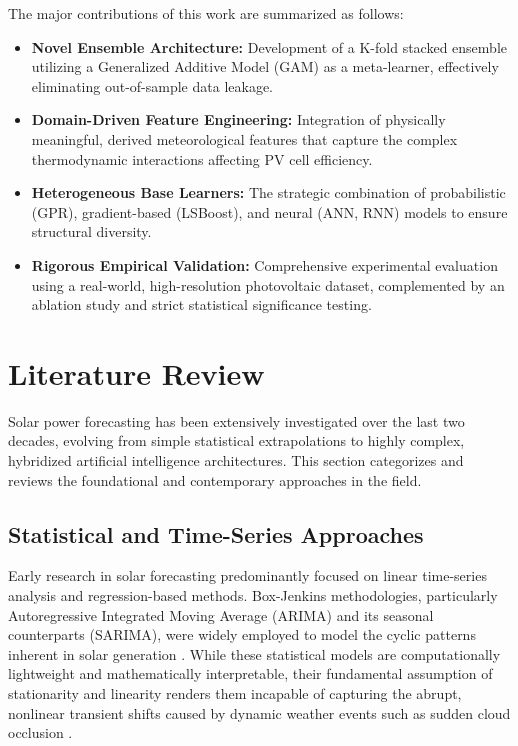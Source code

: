 \documentclass[conference]{IEEEtran}
\begin{document}
The major contributions of this work are summarized as follows:
\begin{itemize}
\item \textbf{Novel Ensemble Architecture:} Development of a K-fold stacked ensemble utilizing a Generalized Additive Model (GAM) as a meta-learner, effectively eliminating out-of-sample data leakage.
\item \textbf{Domain-Driven Feature Engineering:} Integration of physically meaningful, derived meteorological features that capture the complex thermodynamic interactions affecting PV cell efficiency.
\item \textbf{Heterogeneous Base Learners:} The strategic combination of probabilistic (GPR), gradient-based (LSBoost), and neural (ANN, RNN) models to ensure structural diversity.
\item \textbf{Rigorous Empirical Validation:} Comprehensive experimental evaluation using a real-world, high-resolution photovoltaic dataset, complemented by an ablation study and strict statistical significance testing.
\end{itemize}


\section{Literature Review}

Solar power forecasting has been extensively investigated over the last two decades, evolving from simple statistical extrapolations to highly complex, hybridized artificial intelligence architectures. This section categorizes and reviews the foundational and contemporary approaches in the field.

\subsection{Statistical and Time-Series Approaches}
Early research in solar forecasting predominantly focused on linear time-series analysis and regression-based methods. Box-Jenkins methodologies, particularly Autoregressive Integrated Moving Average (ARIMA) and its seasonal counterparts (SARIMA), were widely employed to model the cyclic patterns inherent in solar generation \cite{ref1,ref2,ref3}. While these statistical models are computationally lightweight and mathematically interpretable, their fundamental assumption of stationarity and linearity renders them incapable of capturing the abrupt, nonlinear transient shifts caused by dynamic weather events such as sudden cloud occlusion \cite{ref4,ref5}.
\end{document}
